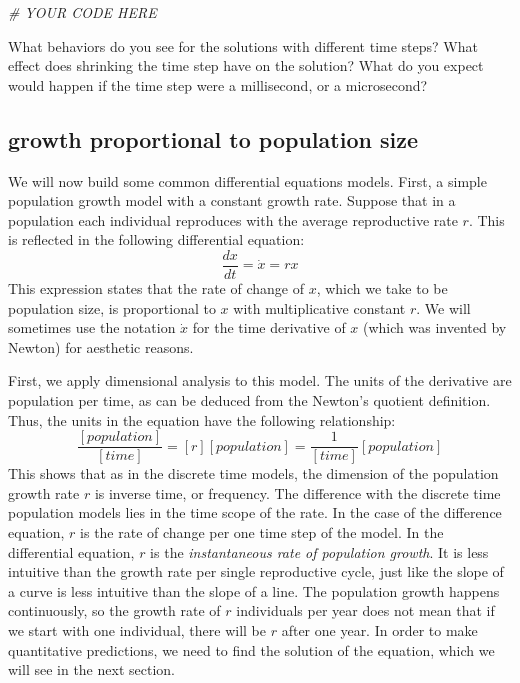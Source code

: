 \documentclass[
]{book}
\newenvironment{Shaded}{\begin{snugshade}}{\end{snugshade}}
\newcommand{\CommentTok}[1]{\textcolor[rgb]{0.56,0.35,0.01}{\textit{#1}}}
\theoremstyle{definition}
\theoremstyle{definition}
\theoremstyle{definition}
\theoremstyle{remark}
\begin{document}
\begin{Shaded}
\begin{Highlighting}[]
\CommentTok{\# YOUR CODE HERE}
\end{Highlighting}
\end{Shaded}

What behaviors do you see for the solutions with different time steps? What effect does shrinking the time step have on the solution? What do you expect would happen if the time step were a millisecond, or a microsecond?

\hypertarget{growth-proportional-to-population-size}{%
\subsection{growth proportional to population size}\label{growth-proportional-to-population-size}}

We will now build some common differential equations models. First, a simple population growth model with a constant growth rate. Suppose that in a population each individual reproduces with the average reproductive rate \(r\). This is reflected in the following differential equation:
\begin{equation}
\frac{d x} {dt} = \dot x = r x
\label{eq:linear_ode}
 \end{equation}
This expression states that the rate of change of \(x\), which we take to be population size, is proportional to \(x\) with multiplicative constant \(r\). We will sometimes use the notation \(\dot x\) for the time derivative of \(x\) (which was invented by Newton) for aesthetic reasons.

First, we apply  dimensional analysis to this model. The units of the derivative are population per time, as can be deduced from the Newton's quotient definition. Thus, the units in the equation have the following relationship:
\[ \frac{[population]}{[time]} = [r] [population] = \frac{1}{[time]}[population] \]
This shows that as in the discrete time models, the dimension of the population growth rate \(r\) is inverse time, or frequency. The difference with the discrete time population models lies in the time scope of the rate. In the case of the difference equation, \(r\) is the rate of change per one time step of the model. In the differential equation, \(r\) is the \emph{instantaneous rate of population growth}. It is less intuitive than the growth rate per single reproductive cycle, just like the slope of a curve is less intuitive than the slope of a line. The population growth happens continuously, so the growth rate of \(r\) individuals per year does not mean that if we start with one individual, there will be \(r\) after one year. In order to make quantitative predictions, we need to find the solution of the equation, which we will see in the next section.
\end{document}
